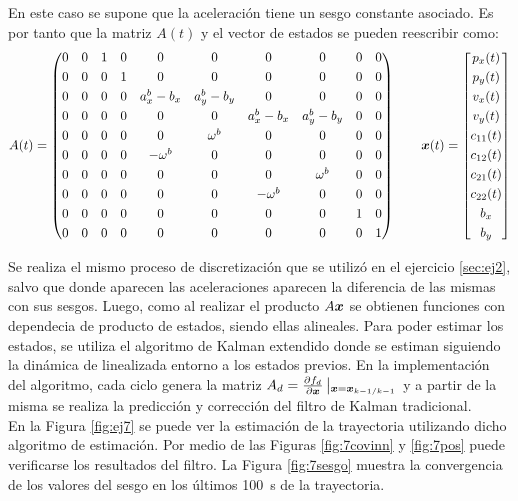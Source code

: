 
En este caso se supone que la aceleración tiene un sesgo constante asociado. Es por tanto que la matriz $A(t)$ y el vector de estados se pueden reescribir como:
		\begin{equation*}
		A(t) = \begin{pmatrix}0&0&1&0&0&0&0&0&0&0\\[0.3em]0&0&0&1&0&0&0&0&0&0\\[0.3em]0&0&0&0&a^b_x - b_x&a^b_y - b_y&0&0&0&0\\[0.3em]0&0&0&0&0&0&a^b_x -b_x&a^b_y - b_y&0&0\\[0.3em]0&0&0&0&0&\omega^b&0&0&0&0\\[0.3em]0&0&0&0&-\omega^b&0&0&0&0&0\\[0.3em]0&0&0&0&0&0&0&\omega^b&0&0\\[0.3em]0&0&0&0&0&0&-\omega^b&0&0&0\\[0.3em]0&0&0&0&0&0&0&0&1&0\\[0.3em] 0&0&0&0&0&0&0&0&0&1\end{pmatrix} \qquad%
			\vect{x}(t) = \begin{bmatrix} {p_x}(t) \\[0.3em] p_y(t) \\[0.3em] {v_x}(t) \\[0.3em] v_y(t) \\[0.3em] c_{11}(t) \\[0.3em] c_{12}(t) \\[0.3em] c_{21}(t) \\[0.3em] c_{22}(t) \\[0.3em] b_x \\[0.3em] b_y \end{bmatrix}
		\end{equation*}

	Se realiza el mismo proceso de discretización que se utilizó en el ejercicio \ref{sec:ej2}, salvo que donde aparecen las aceleraciones aparecen la diferencia de las mismas con sus sesgos. Luego, como al realizar el producto $A\boldsymbol{x}$ se obtienen funciones con dependecia de producto de estados, siendo ellas alineales. Para poder estimar los estados, se utiliza el algoritmo de Kalman extendido donde se estiman siguiendo la dinámica de linealizada entorno a los estados previos. En la implementación del algoritmo, cada ciclo genera la matriz $A_d = \frac{\partial{f_d}}{\partial \boldsymbol{x}}\left| _{\boldsymbol{x}=\boldsymbol{x}_{k-1/k-1}}\right. $ y a partir de la misma se realiza la predicción y corrección del filtro de Kalman tradicional.\\
	\indent En la Figura \ref{fig:ej7} se puede ver la estimación de la trayectoria utilizando dicho algoritmo de estimación. Por medio de las Figuras \ref{fig:7covinn} y \ref{fig:7pos} puede verificarse los resultados del filtro. La Figura \ref{fig:7sesgo} muestra la convergencia de los valores del sesgo en los últimos \SI{100}{\s} de la trayectoria.


